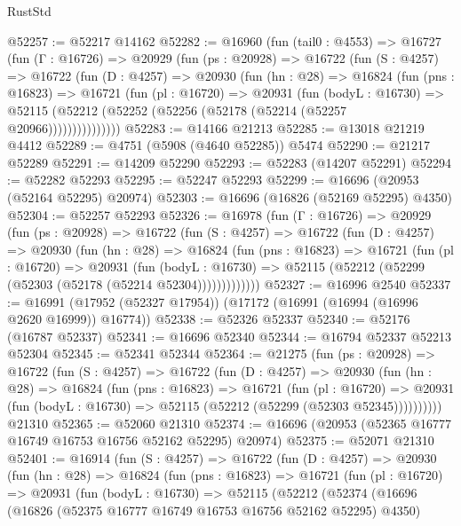 \begin{lexlean}{RustStd}
\begin{coremodule}
@52257 := @52217 @14162
@52282 := @16960
    (fun (tail0 : @4553) =>
    @16727
      (fun (Γ : @16726) =>
      @20929
        (fun (ps : @20928) =>
        @16722
          (fun (S : @4257) =>
          @16722
            (fun (D : @4257) =>
            @20930
              (fun (hn : @28) =>
              @16824
                (fun (pns : @16823) =>
                @16721
                  (fun (pl : @16720) =>
                  @20931
                    (fun (bodyL : @16730) =>
                    @52115 (@52212 (@52252 (@52256 (@52178 (@52214 (@52257 @20966)))))))))))))))
@52283 := @14166 @21213
@52285 := @13018 @21219 @4412
@52289 := @4751 (@5908 (@4640 @52285)) @5474
@52290 := @21217 @52289
@52291 := @14209 @52290
@52293 := @52283 (@14207 @52291)
@52294 := @52282 @52293
@52295 := @52247 @52293
@52299 := @16696 (@20953 (@52164 @52295) @20974)
@52303 := @16696 (@16826 (@52169 @52295) @4350)
@52304 := @52257 @52293
@52326 := @16978
    (fun (Γ : @16726) =>
    @20929
      (fun (ps : @20928) =>
      @16722
        (fun (S : @4257) =>
        @16722
          (fun (D : @4257) =>
          @20930
            (fun (hn : @28) =>
            @16824
              (fun (pns : @16823) =>
              @16721
                (fun (pl : @16720) =>
                @20931
                  (fun (bodyL : @16730) =>
                  @52115 (@52212 (@52299 (@52303 (@52178 (@52214 @52304)))))))))))))
@52327 := @16996 @2540
@52337 := @16991 (@17952 (@52327 @17954)) (@17172 (@16991 (@16994 (@16996 @2620 @16999)) @16774))
@52338 := @52326 @52337
@52340 := @52176 (@16787 @52337)
@52341 := @16696 @52340
@52344 := @16794 @52337 @52213 @52304
@52345 := @52341 @52344
@52364 := @21275
    (fun (ps : @20928) =>
    @16722
      (fun (S : @4257) =>
      @16722
        (fun (D : @4257) =>
        @20930
          (fun (hn : @28) =>
          @16824
            (fun (pns : @16823) =>
            @16721
              (fun (pl : @16720) =>
              @20931 (fun (bodyL : @16730) => @52115 (@52212 (@52299 (@52303 @52345))))))))))
    @21310
@52365 := @52060 @21310
@52374 := @16696 (@20953 (@52365 @16777 @16749 @16753 @16756 @52162 @52295) @20974)
@52375 := @52071 @21310
@52401 := @16914
    (fun (S : @4257) =>
    @16722
      (fun (D : @4257) =>
      @20930
        (fun (hn : @28) =>
        @16824
          (fun (pns : @16823) =>
          @16721
            (fun (pl : @16720) =>
            @20931
              (fun (bodyL : @16730) =>
              @52115
                (@52212
                  (@52374
                    (@16696
                      (@16826 (@52375 @16777 @16749 @16753 @16756 @52162 @52295) @4350)

\end{coremodule}
\end{lexlean}
